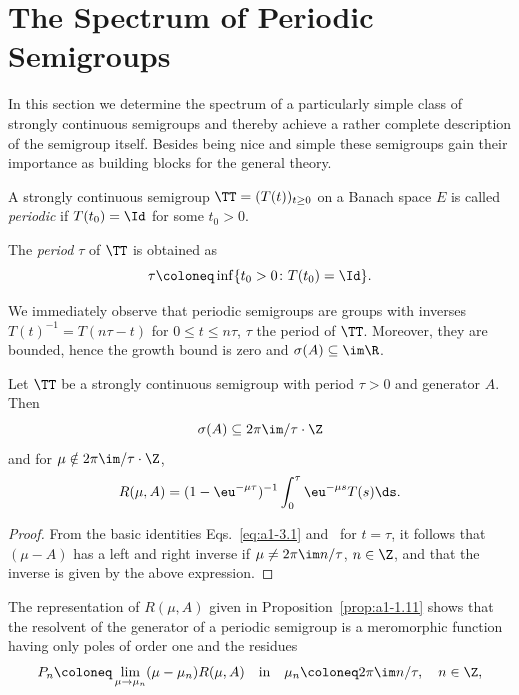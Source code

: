 \section{The Spectrum of Periodic Semigroups} \label{sec:a3-5}
In this section we determine the spectrum of a particularly simple class of strongly continuous semigroups and thereby achieve a rather complete description of the semigroup itself.
Besides being nice and simple these semigroups gain their importance as building blocks for the general theory.
\begin{definition}\label{def:a3-5.1}
A strongly continuous semigroup $\TT = (T(t))_{t \geq 0}$ on a Banach space $E$ is called \emph{periodic} if\/ $T(t_{0}) = \Id$ for some $t_{0} > 0$.

The \emph{period} $\tau$ of\/ $\TT$ is obtained as 
%
\[
	\tau \coloneq \inf\{t_{0} > 0 \colon T(t_{0}) = \Id\} .
\]
%
\end{definition}
We immediately observe that periodic semigroups are groups with inverses $T(t)^{-1} = T(n\tau-t)$ for $0 \leq t \leq n\tau$, $\tau$ the period of\/ $\TT$.
Moreover, they are bounded, hence the growth bound is zero and $\sigma(A) \subseteq \im\R$.
\begin{lemma}\label{lem:a3-5.2}
Let $\TT$ be a strongly continuous semigroup with period $\tau > 0$ and generator $A$.
Then
\[
\sigma(A) \subseteq 2\pi \im/\tau\cdot\Z
\]
and for $\mu \notin 2\pi\im /\tau\cdot\Z$,
\begin{equation}\label{eq:a3-5.1}
R(\mu,A) = (1-\eu^{-\mu\tau})^{-1} \int_{0}^{\tau}\eu^{-\mu s}T(s) \ds .
\end{equation}
\end{lemma}
\begin{proof}
From the basic identities Eqs.~\eqref{eq:a1-3.1} and~ for $t = \tau$, it follows that $(\mu - A)$ has a left and right inverse if\/ $\mu \neq 2\pi\im n/\tau$, $n \in \Z$, and that the inverse is given by the above expression.
\end{proof}
The representation of\/ $R(\mu,A)$ given in Proposition~\ref{prop:a1-1.11} shows that the resolvent of the generator of a periodic semigroup is a meromorphic function having only poles of order one and the residues
\[
P_{n} \coloneq \lim_{\mu \to \mu_{n}} (\mu-\mu_{n})R(\mu,A) \quad \text{in} \quad \mu_{n} \coloneq 2\pi\im n/\tau, \quad n \in \Z ,
\]
